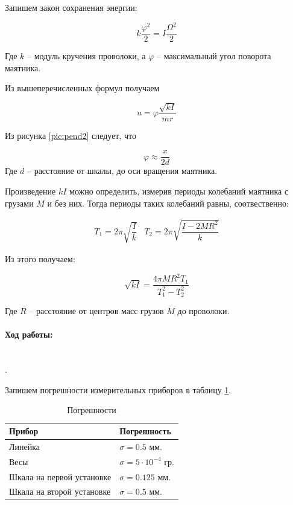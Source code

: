 \documentclass[a4paper, 12pt]{article}
\newcommand{\parag}[1]{\paragraph*{#1:}}
\newcounter{Points}
\newcommand{\point}{\arabic{Points}. \addtocounter{Points}{1}}
\begin{document}
Запишем закон сохранения энергии:

\begin{equation}
    k \frac{\varphi^2}{2} = I\frac{\Omega^2}{2}  
\end{equation}

Где $k$ -- модуль кручения проволоки, а $\varphi$ -- максимальный угол поворота маятника.

Из вышеперечисленных формул получаем

\begin{equation}
    u = \varphi \frac{\sqrt{kI}}{mr}
    \label{eq:speed_for_2}
\end{equation}

Из рисунка \ref{pic:pend2} следует, что 

\begin{equation}
    \varphi \approx \frac{x}{2d}
    \label{eq:phi}
\end{equation}
Где $d$ -- расстояние от шкалы, до оси вращения маятника.

Произведение $kI$ можно определить, измерив периоды колебаний маятника с грузами $M$ и без них. Тогда периоды таких колебаний равны, соотвественно:

\begin{eqnarray}
    T_1 = 2\pi\sqrt{\dfrac{I}{k}} & T_2 = 2\pi\sqrt{\dfrac{I - 2MR^2}{k}}
\end{eqnarray}

Из этого получаем:

\begin{equation}
    \sqrt{kI} = \frac{4\pi M R^2 T_1}{T_1^2 - T_2^2}
    \label{eq:kI}
\end{equation}


Где $R$ -- расстояние от центров масс грузов $M$ до проволоки.


\parag {Ход работы} ~\\

\point Запишем погрешности измерительных приборов в таблицу \ref{tabl:inaccs}.

\begin{table}[H]
    \centering
    \begin{tabular}{|l|l|}
    \hline 
    Прибор                      & Погрешность                   \\ \hline
    Линейка                     & $\sigma = 0.5 $ мм.           \\ \hline
    Весы                        & $\sigma = 5 \cdot 10^{-4}$ гр.\\ \hline
    Шкала на первой установке   & $\sigma = 0.125$ мм.          \\ \hline
    Шкала на второй установке   & $\sigma = 0.5$ мм.            \\ \hline
    \end{tabular}
	\caption{Погрешности}
    \label{tabl:inaccs}
\end{table}
\end{document}
